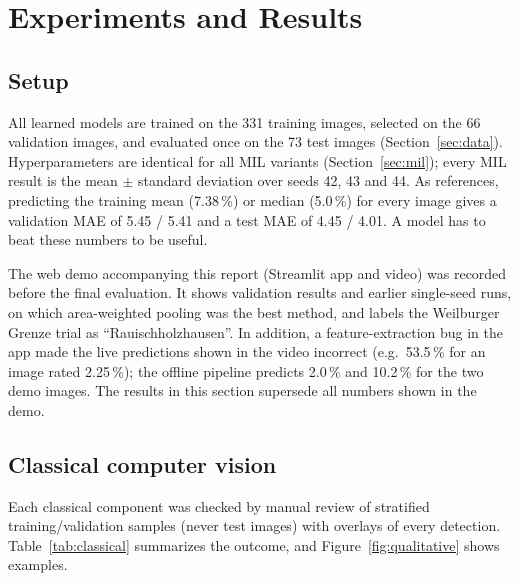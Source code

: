 \section{Experiments and Results}
\label{sec:experiments}

\subsection{Setup}
\label{sec:setup}

All learned models are trained on the 331 training images, selected on the 66 validation images,
and evaluated once on the 73 test images (Section~\ref{sec:data}). Hyperparameters are identical
for all MIL variants (Section~\ref{sec:mil}); every MIL result is the mean $\pm$ standard deviation
over seeds 42, 43 and 44. As references, predicting the training mean (7.38\,\%) or median
(5.0\,\%) for every image gives a validation MAE of 5.45 / 5.41 and a test MAE of 4.45 / 4.01.
A model has to beat these numbers to be useful.

The web demo accompanying this report (Streamlit app and video) was recorded before the final
evaluation. It shows validation results and earlier single-seed runs, on which area-weighted pooling
was the best method, and labels the Weilburger Grenze trial as ``Rauischholzhausen''. In addition, a
feature-extraction bug in the app made the live predictions shown in the video incorrect (e.g.\
53.5\,\% for an image rated 2.25\,\%); the offline pipeline predicts 2.0\,\% and 10.2\,\% for the
two demo images. The results in this section supersede all numbers shown in the demo.

\subsection{Classical computer vision}
\label{sec:res-classical}

Each classical component was checked by manual review of stratified training/validation samples
(never test images) with overlays of every detection. Table~\ref{tab:classical} summarizes the
outcome, and Figure~\ref{fig:qualitative} shows examples.

